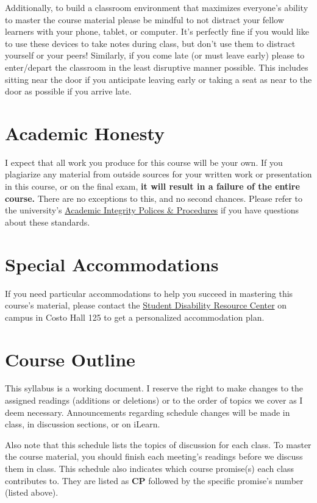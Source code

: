 \documentclass[11pt]{article}
\begin{document}
Additionally, to build a classroom environment that maximizes everyone's ability to master the course material please be mindful to not distract your fellow learners with your phone, tablet, or computer. It's perfectly fine if you would like to use these devices to take notes during class, but don't use them to distract yourself or your peers! Similarly, if you come late (or must leave early) please to enter/depart  the classroom in the least disruptive manner possible. This includes sitting near the door if you anticipate leaving early or taking a seat as near to the door as possible if you arrive late. 


\section*{Academic Honesty}

I expect that all work you produce for this course will be your own. If you plagiarize any material from outside sources for your written work or presentation in this course, or on the final exam, \textbf{it will result in a failure of the entire course.} There are no exceptions to this, and no second chances. Please refer to the university's \href{https://conduct.ucr.edu/policies/academic-integrity-policies-and-procedures}{Academic Integrity Polices \& Procedures} if you have questions about these standards. 


\section*{Special Accommodations}

If you need particular accommodations to help you succeed in mastering this course's material, please contact the \href{https://sdrc.ucr.edu}{Student Disability Resource Center} on campus in Costo Hall 125 to get a personalized accommodation plan.


\section*{Course Outline}

This syllabus is a working document. I reserve the right to make changes to the assigned readings (additions or deletions) or to the order of topics we cover as I deem necessary. Announcements regarding schedule changes will be made in class, in discussion sections, or on iLearn.

Also note that this schedule lists the topics of discussion for each class. To master the course material, you should finish each meeting's readings before we discuss them in class. This schedule also indicates which course promise(s) each class contributes to. They are listed as \textbf{CP} followed by the specific promise's number (listed above). 
\end{document}
